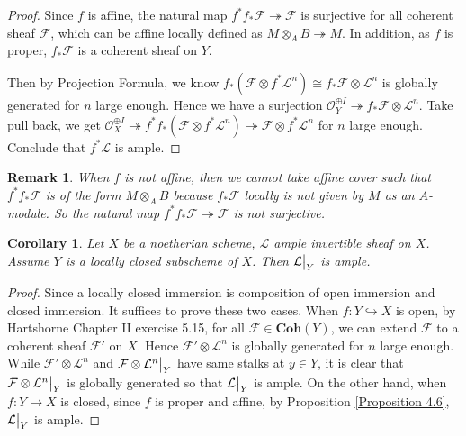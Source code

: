 \documentclass{ctexart}
\newtheorem{remark}{Remark}[section]
\newtheorem{corollary}{Corollary}[section]
\newcommand{\coherent}{\mathbf{Coh}}
\begin{document}
\begin{proof}
    Since $f$ is affine, the natural map $f^{\ast}f_{\ast}\mathcal{F} \twoheadrightarrow \mathcal{F}$ is surjective for all coherent sheaf $\mathcal{F}$,
    which can be affine locally defined as $M \otimes_{A} B \twoheadrightarrow M$.
    In addition, as $f$ is proper, $f_{\ast}\mathcal{F}$ is a coherent sheaf on $Y$.
    \par
    Then by Projection Formula, we know $f_{\ast}(\mathcal{F} \otimes f^{\ast}\mathcal{L}^{n}) \cong f_{\ast}\mathcal{F} \otimes \mathcal{L}^{n}$ is globally generated for $n$ large enough.
    Hence we have a surjection $\mathcal{O}_{Y}^{\oplus I} \twoheadrightarrow f_{\ast}\mathcal{F} \otimes \mathcal{L}^{n}$.
    Take pull back, we get $\mathcal{O}_{X}^{\oplus I} \twoheadrightarrow f^{\ast}f_{\ast}(\mathcal{F} \otimes f^{\ast}\mathcal{L}^{n}) \twoheadrightarrow \mathcal{F} \otimes f^{\ast}\mathcal{L}^{n}$ for $n$ large enough.
    Conclude that $f^{\ast}\mathcal{L}$ is ample.
\end{proof}
\begin{remark}
    When $f$ is not affine, then we cannot take affine cover such that $f^{\ast}f_{\ast}\mathcal{F}$ is of the form $M \otimes_{A} B$ because $f_{\ast}\mathcal{F}$ locally is not given by $M$ as an $A$-module.
    So the natural map $f^{\ast}f_{\ast}\mathcal{F} \twoheadrightarrow \mathcal{F}$ is not surjective.
\end{remark}
\begin{corollary}
    Let $X$ be a noetherian scheme, $\mathcal{L}$ ample invertible sheaf on $X$.
    Assume $Y$ is a locally closed subscheme of $X$.
    Then $\mathcal{L}\big{|}_{Y}$ is ample.
    \label{Corollary 4.3}
\end{corollary}
\begin{proof}
    Since a locally closed immersion is composition of open immersion and closed immersion.
    It suffices to prove these two cases.
    When $f: Y \hookrightarrow X$ is open, by Hartshorne Chapter II exercise 5.15,
    for all $\mathcal{F}\in \coherent (Y)$, we can extend $\mathcal{F}$ to a coherent sheaf $\mathcal{F}'$ on $X$.
    Hence $\mathcal{F}' \otimes \mathcal{L}^{n}$ is globally generated for $n$ large enough.
    While $\mathcal{F}' \otimes \mathcal{L}^{n}$ and $\mathcal{F} \otimes \mathcal{L}^{n}\big{|}_{Y}$ have same stalks at $y\in Y$,
    it is clear that $\mathcal{F} \otimes \mathcal{L}^{n}\big{|}_{Y}$ is globally generated so that $\mathcal{L}\big{|}_{Y}$ is ample.
    On the other hand, when $f: Y \rightarrow X$ is closed, since $f$ is proper and affine, 
    by Proposition \ref{Proposition 4.6}, $\mathcal{L}\big{|}_{Y}$ is ample.
\end{proof}
\end{document}
